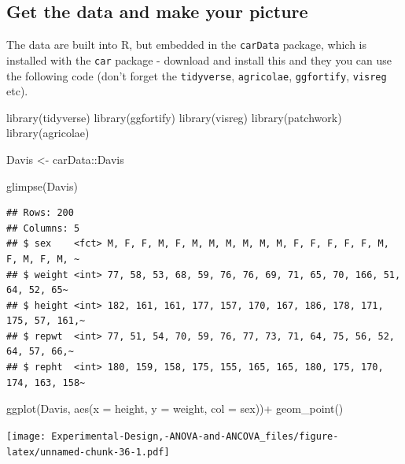 \documentclass[
]{book}
\newenvironment{Shaded}{\begin{snugshade}}{\end{snugshade}}
\newcommand{\AttributeTok}[1]{\textcolor[rgb]{0.77,0.63,0.00}{#1}}
\newcommand{\FunctionTok}[1]{\textcolor[rgb]{0.00,0.00,0.00}{#1}}
\newcommand{\NormalTok}[1]{#1}
\newcommand{\OtherTok}[1]{\textcolor[rgb]{0.56,0.35,0.01}{#1}}
\newcommand{\SpecialCharTok}[1]{\textcolor[rgb]{0.00,0.00,0.00}{#1}}
\begin{document}
\hypertarget{get-the-data-and-make-your-picture}{%
\subsection{Get the data and make your picture}\label{get-the-data-and-make-your-picture}}

The data are built into R, but embedded in the \texttt{carData} package, which is installed with the \texttt{car} package - download and install this and they you can use the following code (don't forget the \texttt{tidyverse}, \texttt{agricolae}, \texttt{ggfortify}, \texttt{visreg} etc).

\begin{Shaded}
\begin{Highlighting}[]
\FunctionTok{library}\NormalTok{(tidyverse)}
\FunctionTok{library}\NormalTok{(ggfortify)}
\FunctionTok{library}\NormalTok{(visreg)}
\FunctionTok{library}\NormalTok{(patchwork)}
\FunctionTok{library}\NormalTok{(agricolae)}


\NormalTok{Davis }\OtherTok{\textless{}{-}}\NormalTok{ carData}\SpecialCharTok{::}\NormalTok{Davis}

\FunctionTok{glimpse}\NormalTok{(Davis)}
\end{Highlighting}
\end{Shaded}

\begin{verbatim}
## Rows: 200
## Columns: 5
## $ sex    <fct> M, F, F, M, F, M, M, M, M, M, M, F, F, F, F, F, M, F, M, F, M, ~
## $ weight <int> 77, 58, 53, 68, 59, 76, 76, 69, 71, 65, 70, 166, 51, 64, 52, 65~
## $ height <int> 182, 161, 161, 177, 157, 170, 167, 186, 178, 171, 175, 57, 161,~
## $ repwt  <int> 77, 51, 54, 70, 59, 76, 77, 73, 71, 64, 75, 56, 52, 64, 57, 66,~
## $ repht  <int> 180, 159, 158, 175, 155, 165, 165, 180, 175, 170, 174, 163, 158~
\end{verbatim}

\begin{Shaded}
\begin{Highlighting}[]
\FunctionTok{ggplot}\NormalTok{(Davis, }\FunctionTok{aes}\NormalTok{(}\AttributeTok{x =}\NormalTok{ height, }\AttributeTok{y =}\NormalTok{ weight, }\AttributeTok{col =}\NormalTok{ sex))}\SpecialCharTok{+}
  \FunctionTok{geom\_point}\NormalTok{()}
\end{Highlighting}
\end{Shaded}

\texttt{[image: Experimental-Design,-ANOVA-and-ANCOVA\_files/figure-latex/unnamed-chunk-36-1.pdf]}
\end{document}
